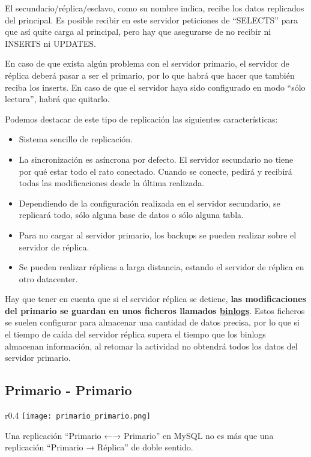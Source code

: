 El secundario/réplica/esclavo, como su nombre indica, recibe los datos replicados del principal. Es posible recibir en este servidor peticiones de “SELECTS” para que así quite carga al principal, pero hay que asegurarse de no recibir ni INSERTS ni UPDATES.

En caso de que exista algún problema con el servidor primario, el servidor de réplica deberá pasar a ser el primario, por lo que habrá que hacer que también reciba los inserts. En caso de que el servidor haya sido configurado en modo “sólo lectura”, habrá que quitarlo.

Podemos destacar de este tipo de replicación las siguientes características:


\begin{itemize}
    \item Sistema sencillo de replicación.
    \item La sincronización es asíncrona por defecto. El servidor secundario no tiene por qué estar todo el rato conectado. Cuando se conecte, pedirá y recibirá todas las modificaciones desde la última realizada.
    \item Dependiendo de la configuración realizada en el servidor secundario, se replicará todo, sólo alguna base de datos o sólo alguna tabla.
    \item Para no cargar al servidor primario, los backups se pueden realizar sobre el servidor de réplica.
    \item Se pueden realizar réplicas a larga distancia, estando el servidor de réplica en otro datacenter.

\end{itemize}


Hay que tener en cuenta que si el servidor réplica se detiene, \textbf{las modificaciones del primario se guardan en unos ficheros llamados \underline{binlogs}}. Estos ficheros se suelen configurar para almacenar una cantidad de datos precisa, por lo que si el tiempo de caída del servidor réplica supera el tiempo que los binlogs almacenan información, al retomar la actividad no obtendrá todos los datos del servidor primario.



\subsection{Primario - Primario}
\begin{wrapfigure}{r}{0.4\linewidth}
    \centering
    \vspace{-50pt}
    \texttt{[image: primario\_primario.png]}
    \vspace{-30pt}
\end{wrapfigure}
Una replicación “Primario ←→ Primario” en MySQL no es más que una replicación “Primario → Réplica” de doble sentido.

